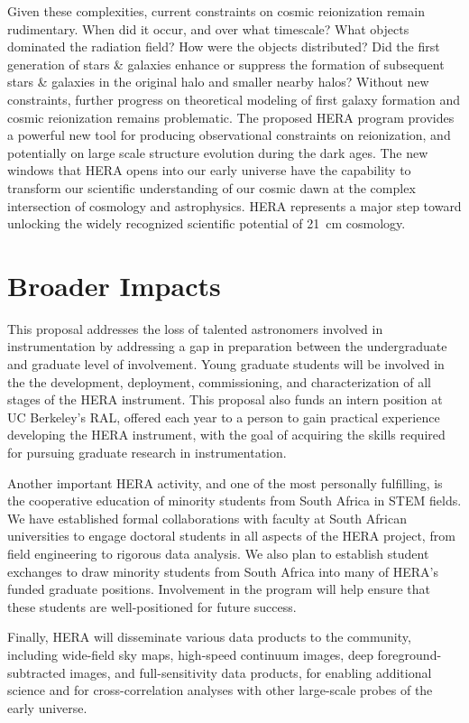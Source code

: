 \documentclass[preprint]{aastex}
\begin{document}
Given these complexities, current constraints on cosmic reionization remain rudimentary. When did it
occur, and over what timescale?  What objects dominated the radiation field?
How were the objects distributed? Did the first generation of stars \& galaxies
enhance or suppress the formation of subsequent stars \& galaxies in the
original halo and smaller nearby halos? Without new constraints, further
progress on theoretical modeling of first galaxy formation and cosmic
reionization remains problematic.  The proposed HERA program provides a
powerful new tool for producing observational constraints on reionization, and
potentially on large scale structure evolution during the dark ages.  The new
windows that HERA opens into our early universe have the capability to
transform our scientific understanding of our cosmic dawn at the complex intersection of cosmology
and astrophysics.  HERA represents a major step toward unlocking the widely recognized scientific potential of
21~cm cosmology.

\section*{Broader Impacts}

This proposal addresses the loss of talented astronomers involved in
instrumentation by addressing a gap in preparation between the undergraduate
and graduate level of involvement.  Young graduate students will be involved
in the the development,
deployment, commissioning, and characterization of all stages of the HERA
instrument. This proposal also funds an intern
position at UC Berkeley's RAL, offered each year to a person to gain
practical experience developing
the HERA instrument, with the goal of acquiring the skills required for
pursuing graduate research in instrumentation.

Another important HERA activity, and
one of the most personally fulfilling, is the cooperative education of
minority students from South Africa in STEM fields.
We have established formal collaborations
with faculty at South African universities to engage doctoral students in all aspects of the HERA project, from
field engineering to rigorous data analysis. We also plan to establish
student exchanges to draw
minority students from South Africa into many of HERA's funded graduate positions.
Involvement in the
program will help ensure that these students are well-positioned for
future success.

Finally, HERA will disseminate various data products to the community,
including wide-field sky maps, high-speed continuum images, deep
foreground-subtracted images, and full-sensitivity data products, for enabling
additional science and for cross-correlation analyses with other large-scale
probes of the early universe.
\end{document}

